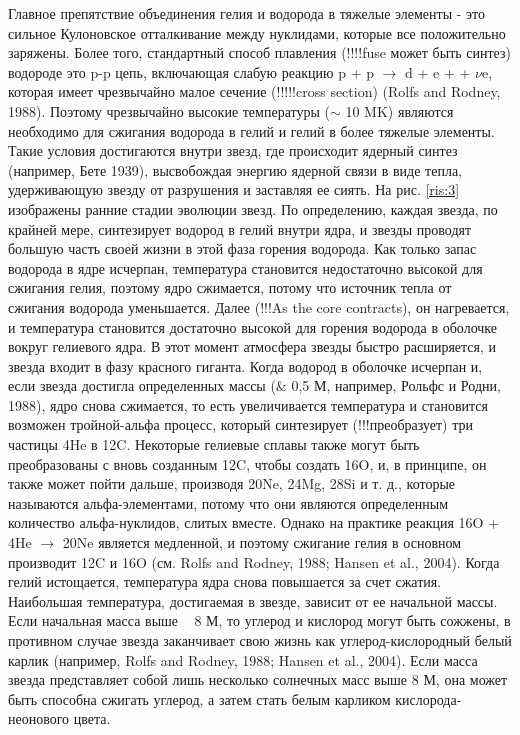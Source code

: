\documentclass[%
bachelor,    %
natbib,      %
subf,        %
href,        %
colorlinks,  %
]{disser}
\begin{document}
Главное препятствие объединения гелия и водорода в тяжелые элементы - это сильное Кулоновское отталкивание между нуклидами, которые все положительно заряжены. Более того, стандартный способ плавления (!!!!fuse может быть синтез) водороде это p-p цепь, включающая слабую реакцию p + p $\rightarrow$ d + e + + $\nu$e, которая имеет чрезвычайно малое сечение (!!!!!cross section) (Rolfs and Rodney, 1988). Поэтому чрезвычайно высокие температуры ($\sim$ 10 MK) являются необходимо для сжигания водорода в гелий и гелий в более тяжелые элементы. Такие условия достигаются внутри звезд, где происходит ядерный синтез (например, Бете 1939), высвобождая энергию ядерной связи в виде тепла, удерживающую звезду от разрушения и заставляя ее сиять.
На рис. \ref{ris:3} изображены ранние стадии эволюции звезд. По определению, каждая звезда, по крайней мере, синтезирует водород в гелий внутри ядра, и звезды проводят большую часть своей жизни в этой фаза горения водорода. Как только запас водорода в ядре исчерпан, температура становится недостаточно высокой для сжигания гелия, поэтому ядро сжимается, потому что источник тепла от сжигания водорода уменьшается. Далее (!!!As the core contracts), он нагревается, и температура становится достаточно высокой для горения водорода в оболочке вокруг гелиевого ядра. В этот момент атмосфера звезды быстро расширяется, и звезда входит в фазу красного гиганта. Когда водород в оболочке исчерпан и, если звезда достигла определенных массы ($\&$ 0,5 М, например, Рольфс и Родни, 1988), ядро снова сжимается, то есть увеличивается температура и становится возможен тройной-альфа процесс, который синтезирует (!!!преобразует) три частицы 4He в 12C. Некоторые гелиевые сплавы также могут быть преобразованы с вновь созданным 12C, чтобы создать 16O, и, в принципе, он также может пойти дальше, производя 20Ne, 24Mg, 28Si и т. д., которые называются альфа-элементами, потому что они являются определенным количество альфа-нуклидов, слитых вместе. Однако на практике реакция 16O + 4He $\rightarrow$ 20Ne является медленной, и поэтому сжигание гелия в основном производит 12C и 16O (см. Rolfs and Rodney, 1988; Hansen et al., 2004). Когда гелий истощается, температура ядра снова повышается за счет сжатия. Наибольшая температура, достигаемая в звезде, зависит от ее начальной массы. Если начальная масса выше ~ 8 М, то углерод и кислород могут быть сожжены, в противном случае звезда заканчивает свою жизнь как углерод-кислородный белый карлик (например, Rolfs and Rodney, 1988; Hansen et al., 2004). Если масса звезда представляет собой лишь несколько солнечных масс выше 8 М, она может быть способна сжигать углерод, а затем стать белым карликом кислорода-неонового цвета.
\end{document}
